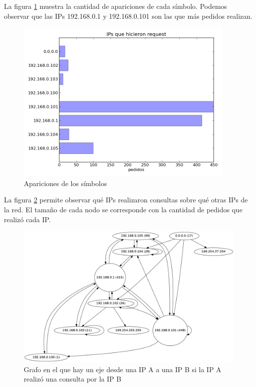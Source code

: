\documentclass{article}
\begin{document}
La figura \ref{fig:red1requesters:count} muestra la cantidad de apariciones de
cada símbolo. Podemos observar que las IPs 192.168.0.1 y 192.168.0.101 son las
que más pedidos realizan.

\begin{figure}[h!]
    \centering                                                       
    \includegraphics[width=300pt]{red1requesters.png}
    \caption{Apariciones de los símbolos}
    \label{fig:red1requesters:count}
\end{figure}

La figura \ref{fig:red1requesters:graph} permite observar qué IPs realizaron
consultas sobre qué otras IPs de la red. El tamaño de cada nodo se corresponde
con la cantidad de pedidos que realizó cada IP.

\begin{figure}[h!]
    \centering
    \includegraphics[width=350pt]{red1requestersgraph.png}
    \caption{Grafo en el que hay un eje desde una IP A a una IP B si la IP A
        realizó una consulta por la IP B}
    \label{fig:red1requesters:graph}
\end{figure}
\end{document}
